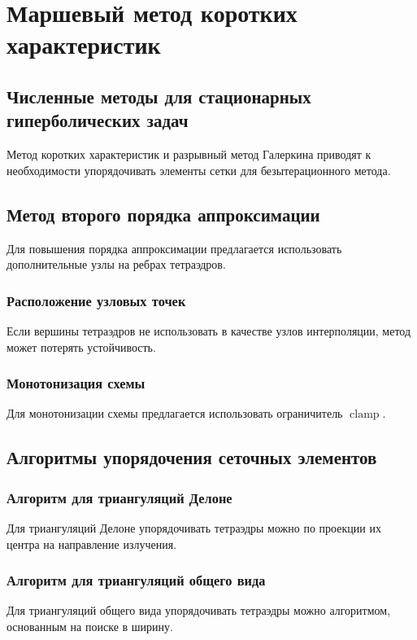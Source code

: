 \chapter{Маршевый метод коротких характеристик}

\section{Численные методы для стационарных гиперболических задач}

Метод коротких характеристик и разрывный метод Галеркина приводят к необходимости  упорядочивать элементы сетки для безытерационного метода.

\section{Метод второго порядка аппроксимации}

Для повышения порядка аппроксимации предлагается использовать дополнительные узлы на ребрах тетраэдров.

\subsection{Расположение узловых точек}

Если вершины тетраэдров не использовать в качестве узлов интерполяции, метод может потерять устойчивость.

\subsection{Монотонизация схемы}

Для монотонизации схемы предлагается использовать ограничитель $\operatorname{clamp}$.

\section{Алгоритмы упорядочения сеточных элементов}
\subsection{Алгоритм для триангуляций Делоне}

Для триангуляций Делоне упорядочивать тетраэдры можно по проекции их центра на направление излучения.

\subsection{Алгоритм для триангуляций общего вида}

Для триангуляций общего вида упорядочивать тетраэдры можно алгоритмом, основанным на поиске в ширину.